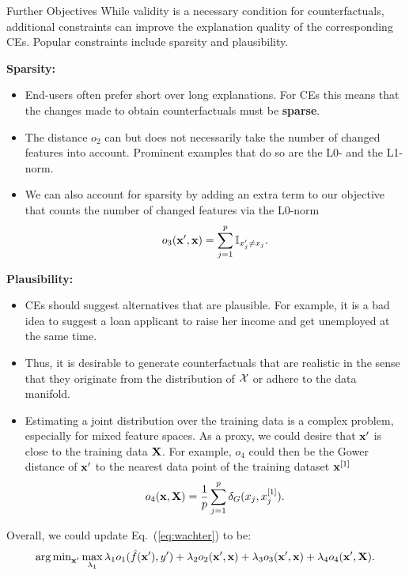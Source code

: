 \documentclass[11pt,compress,t,notes=noshow, xcolor=table]{beamer}
\begin{document}
\begin{vbframe}{Further Objectives}
	While validity is a necessary condition for counterfactuals, additional constraints can improve the explanation quality of the corresponding CEs. Popular constraints include sparsity and plausibility.
	
	\textbf{Sparsity:}
	\begin{itemize}
		\item End-users often prefer short over long explanations. For CEs this means that the changes made to obtain counterfactuals must be \textbf{sparse}. 
		\item The distance $o_2$ can but does not necessarily take the number of changed features into account. Prominent examples that do so are the L0- and the L1-norm.
        \item We can also account for sparsity by adding an extra term to our objective that counts the number of changed features via the L0-norm $$o_3(\xv', \xv) = \sum_{j = 1}^p \mathbb{I}_{x'_j \neq x_j}.$$ 
	\end{itemize}
	\framebreak
	\textbf{Plausibility:}
	\begin{itemize}
	    \item CEs should suggest alternatives that are plausible. For example, it is a bad idea to suggest a loan applicant to raise her income and get unemployed at the same time. 
	    \item Thus, it is desirable to generate counterfactuals that are realistic in the sense that they originate from the distribution of $\Xspace$ or adhere to the data manifold. 
		\item Estimating a joint distribution over the training data is a complex problem, especially for mixed feature spaces. As a proxy, we could desire that $\xv'$ is close to the training data $\Xmat$. For example, $o_4$ could then be the Gower distance of $\xv'$ to the nearest data point of the training dataset $\xv^{[1]}$
		$$o_4(\xv, \Xmat) =  \frac{1}{p} \sum_{j = 1}^{p}  \delta_G(x_j, x^{[1]}_j).$$
	\end{itemize}	
	Overall, we could update Eq.~(\ref{eq:wachter}) to be: 
	\begin{equation}
		\argmin_{\xv'} \max_{\lambda_1} \lambda_1 o_1(\fh(\xv'), y') + \lambda_2 o_2(\xv', \xv) + \lambda_3 o_3(\xv', \xv) + \lambda_4 o_4(\xv', \Xmat).
	\end{equation}
	

\end{vbframe}
\end{document}
